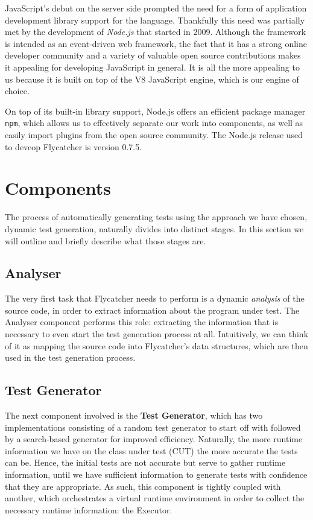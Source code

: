 JavaScript's debut on the server side prompted the need for a form of application development library support for the language. Thankfully this need was partially met by the development of \emph{Node.js} that started in 2009. Although the framework is intended as an event-driven web framework, the fact that it has a strong online developer community and a variety of valuable open source contributions makes it appealing for developing JavaScript in general. It is all the more appealing to us because it is built on top of the V8 JavaScript engine, which is our engine of choice.

On top of its built-in library support, Node.js offers an efficient package manager \texttt{npm}, which allows us to effectively separate our work into components, as well as easily import plugins from the open source community. The Node.js release used to deveop \textsf{Flycatcher} is version 0.7.5.


\section{Components}
The process of automatically generating tests using the approach we have chosen, dynamic test generation, naturally divides into distinct stages. In this section we will outline and briefly describe what those stages are.

\subsection{Analyser}
The very first task that \textsf{Flycatcher} needs to perform is a dynamic \emph{analysis} of the source code, in order to extract information about the program under test. The \textsf{Analyser} component performs this role: extracting the information that is necessary to even start the test generation process at all. Intuitively, we can think of it as mapping the source code into \textsf{Flycatcher}'s data structures, which are then used in the test generation process.

\subsection{Test Generator}
The next component involved is the \textbf{Test Generator}, which has two implementations consisting of a random test generator to start off with followed by a search-based generator for improved efficiency. Naturally, the more runtime information we have on the class under test (CUT) the more accurate the tests can be. Hence, the initial tests are not accurate but serve to gather runtime information, until we have sufficient information to generate tests with confidence that they are appropriate. As such, this component is tightly coupled with another, which orchestrates a virtual runtime environment in order to collect the necessary runtime information: the \textsf{Executor}.

